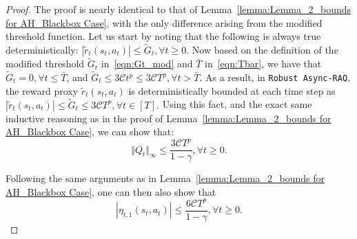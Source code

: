 \documentclass{article}
\newcommand{\mc}{\mathcal}
\begin{document}
\begin{proof} The proof is nearly identical to that of Lemma~\ref{lemma:Lemma_2_bounds for AH_Blackbox Case}, with the only difference arising from the modified threshold function. Let us start by noting that the following is always true deterministically: $|\tilde{r}_t(s_t, a_t)| \leq \tilde{G}_t, \forall t \geq 0.$ Now based on the definition of the modified threshold $\tilde{G}_t$ in~\eqref{eqn:Gt_mod} and $\bar{T}$ in~\eqref{eqn:Tbar}, we have that $\tilde{G}_t =0, \forall t \leq \bar{T}$, and $\tilde{G}_t \leq 3 \mc{C} t^{p} \leq 3 \mc{C} T^p, \forall t > \bar{T}.$ As a result, in \texttt{Robust Async-RAQ}, the reward proxy \(\tilde{r}_t(s_t,a_t)\) is deterministically bounded at each time step as \(|\tilde{r}_t(s_t,a_t)| \leq \tilde{G}_t \leq 3 \mathcal{C} T^p, \forall t \in [T].\) Using this fact, and the exact same inductive reasoning as in the proof of Lemma~\ref{lemma:Lemma_2_bounds for AH_Blackbox Case}, we can show that: 
\begin{equation}\label{eqn:Qtcourse_bnd}
    \Vert Q_t \Vert_{\infty} \le \frac{3 \mathcal{C} T^p}{1 - \gamma}, \forall t \geq 0.
\end{equation}

Following the same arguments as in Lemma~\ref{lemma:Lemma_2_bounds for AH_Blackbox Case}, one can then also show that 
\begin{equation}
\label{eqn:etaCourse_bnd}
\left| \eta_{t,1}(s_t,a_t) \right|  \leq  \frac{6 \mathcal{C} T^p}{1 - \gamma}, \forall t \geq 0.
\end{equation}


\end{proof}
\end{document}
